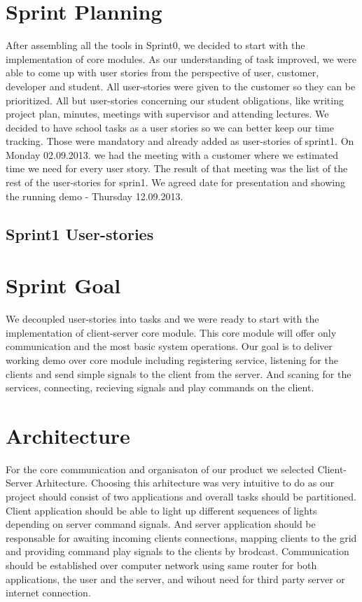 \section{Sprint Planning}
After assembling all the tools in Sprint0, we decided to start with the implementation of core modules.
As our understanding of task improved, we were able to come up with user stories from the perspective of user, customer, developer and student.
All user-stories were given to the customer so they can be prioritized. 
All but user-stories concerning our student obligations, like writing project plan, minutes, meetings with supervisor and attending lectures.
We decided to have school tasks as a user stories so we can better keep our time tracking. 
Those were mandatory and already added as user-stories of sprint1.
On Monday 02.09.2013. we had the meeting with a customer where we estimated time we need for every user story.
The result of that meeting was the list of the rest of the user-stories for sprin1.
We agreed date for presentation and showing the running demo - Thursday 12.09.2013.

\subsection{Sprint1 User-stories}


\section{Sprint Goal}
We decoupled user-stories into tasks and we were ready to start with the implementation of client-server core module.
This core module will offer only communication and the most basic system operations. 
Our goal is to deliver working demo over core module including registering service, listening for the clients and send simple signals to the client from the server.
And scaning for the services, connecting, recieving signals and play commands on the client. 

\section{Architecture}

For the core communication and organisaton of our product we selected Client-Server Arhitecture.
Choosing this arhitecture was very intuitive to do as our project should consist of two applications and overall tasks should be partitioned. 
Client application should be able to light up different sequences of lights depending on server command signals.
And server application should be responsable for awaiting incoming clients connections, mapping clients to the grid and providing command play signals to the clients by brodcast.
Communication should be established over computer network using same router for both applications, the user and the server, and wihout need for third party server or internet connection. 


